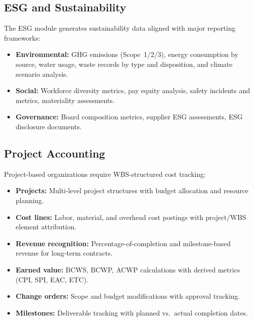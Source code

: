 \subsection{ESG and Sustainability}
\label{sec:gen_esg}

The ESG module generates sustainability data aligned with major
reporting frameworks:

\begin{itemize}
  \item \textbf{Environmental:} GHG emissions (Scope~1/2/3), energy
    consumption by source, water usage, waste records by type and
    disposition, and climate scenario analysis.
  \item \textbf{Social:} Workforce diversity metrics, pay equity
    analysis, safety incidents and metrics, materiality assessments.
  \item \textbf{Governance:} Board composition metrics, supplier ESG
    assessments, ESG disclosure documents.
\end{itemize}

\subsection{Project Accounting}
\label{sec:gen_project}

Project-based organizations require WBS-structured cost tracking:

\begin{itemize}
  \item \textbf{Projects:} Multi-level project structures with budget
    allocation and resource planning.
  \item \textbf{Cost lines:} Labor, material, and overhead cost
    postings with project/WBS element attribution.
  \item \textbf{Revenue recognition:} Percentage-of-completion and
    milestone-based revenue for long-term contracts.
  \item \textbf{Earned value:} BCWS, BCWP, ACWP calculations with
    derived metrics (CPI, SPI, EAC, ETC).
  \item \textbf{Change orders:} Scope and budget modifications with
    approval tracking.
  \item \textbf{Milestones:} Deliverable tracking with planned vs.\
    actual completion dates.
\end{itemize}

